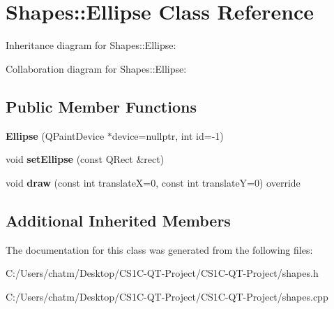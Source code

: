 \hypertarget{class_shapes_1_1_ellipse}{}\section{Shapes\+::Ellipse Class Reference}
\label{class_shapes_1_1_ellipse}


Inheritance diagram for Shapes\+::Ellipse\+:


Collaboration diagram for Shapes\+::Ellipse\+:
\subsection*{Public Member Functions}
\begin{DoxyCompactItemize}
\item 
\mbox{\label{class_shapes_1_1_ellipse_a7ed5fc740a799dceec2f7c3913fe9f76}} 
{\bfseries Ellipse} (Q\+Paint\+Device $\ast$device=nullptr, int id=-\/1)
\item 
\mbox{\label{class_shapes_1_1_ellipse_a4720b5fe02b5f920169e6352c5aa7ed4}} 
void {\bfseries set\+Ellipse} (const Q\+Rect \&rect)
\item 
\mbox{\label{class_shapes_1_1_ellipse_a52854379c691a30d8cf58cdd95d6f86f}} 
void {\bfseries draw} (const int translateX=0, const int translateY=0) override
\end{DoxyCompactItemize}
\subsection*{Additional Inherited Members}


The documentation for this class was generated from the following files\+:\begin{DoxyCompactItemize}
\item 
C\+:/\+Users/chatm/\+Desktop/\+C\+S1\+C-\/\+Q\+T-\/\+Project/\+C\+S1\+C-\/\+Q\+T-\/\+Project/shapes.\+h\item 
C\+:/\+Users/chatm/\+Desktop/\+C\+S1\+C-\/\+Q\+T-\/\+Project/\+C\+S1\+C-\/\+Q\+T-\/\+Project/shapes.\+cpp\end{DoxyCompactItemize}
